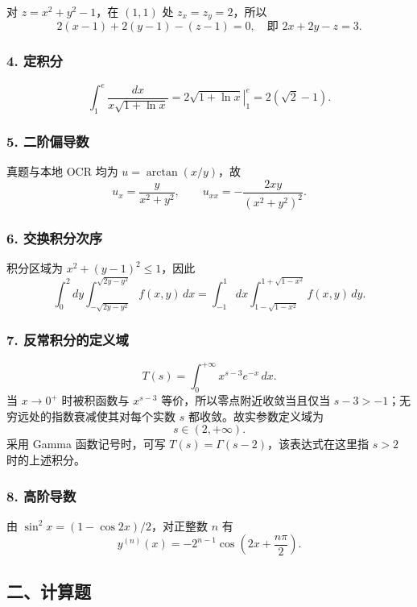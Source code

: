 \documentclass[11pt,fontset=fandol]{ctexart}
\begin{document}
对 \(z=x^2+y^2-1\)，在 \((1,1)\) 处 \(z_x=z_y=2\)，所以 \[
\boxed{2(x-1)+2(y-1)-(z-1)=0,\quad\text{即 }2x+2y-z=3.}
\]

\subsubsection{4. 定积分}\label{ux5b9aux79efux5206}

\[
\boxed{\int_1^e\frac{dx}{x\sqrt{1+\ln x}}
=\left.2\sqrt{1+\ln x}\right|_1^e=2(\sqrt2-1).}
\]

\subsubsection{5. 二阶偏导数}\label{ux4e8cux9636ux504fux5bfcux6570}

真题与本地 OCR 均为 \(u=\arctan(x/y)\)，故 \[
u_x=\frac{y}{x^2+y^2},\qquad
\boxed{u_{xx}=-\frac{2xy}{(x^2+y^2)^2}.}
\]

\subsubsection{6.
交换积分次序}\label{ux4ea4ux6362ux79efux5206ux6b21ux5e8f}

积分区域为 \(x^2+(y-1)^2\leq1\)，因此 \[
\boxed{\int_0^2dy\int_{-\sqrt{2y-y^2}}^{\sqrt{2y-y^2}}f(x,y)\,dx
=\int_{-1}^1dx\int_{1-\sqrt{1-x^2}}^{1+\sqrt{1-x^2}}f(x,y)\,dy.}
\]

\subsubsection{7.
反常积分的定义域}\label{ux53cdux5e38ux79efux5206ux7684ux5b9aux4e49ux57df}

\[
T(s)=\int_0^{+\infty}x^{s-3}e^{-x}\,dx.
\] 当 \(x\to0^+\) 时被积函数与 \(x^{s-3}\)
等价，所以零点附近收敛当且仅当
\(s-3>-1\)；无穷远处的指数衰减使其对每个实数 \(s\)
都收敛。故实参数定义域为 \[
\boxed{s\in(2,+\infty).}
\] 采用 Gamma 函数记号时，可写 \(T(s)=\Gamma(s-2)\)，该表达式在这里指
\(s>2\) 时的上述积分。

\subsubsection{8. 高阶导数}\label{ux9ad8ux9636ux5bfcux6570}

由 \(\sin^2x=(1-\cos2x)/2\)，对正整数 \(n\) 有 \[
\boxed{y^{(n)}(x)=-2^{n-1}\cos\left(2x+\frac{n\pi}{2}\right).}
\]

\subsection{二、计算题}\label{ux4e8cux8ba1ux7b97ux9898}
\end{document}
